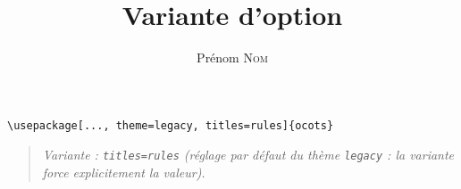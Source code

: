 \documentclass[11pt]{ocots-book}
\title{Variante d'option}
\author{Prénom \textsc{Nom}}
\newcommand{\ocotsvariantnote}[1]{\begin{quote}\itshape Variante : #1\end{quote}}
\begin{document}
\maketitle

\begin{lstlisting}
\usepackage[..., theme=legacy, titles=rules]{ocots}
\end{lstlisting}
\ocotsvariantnote{\texttt{titles=rules} (r\'eglage par d\'efaut du th\`eme \texttt{legacy} : la variante force explicitement la valeur).}

\end{document}
